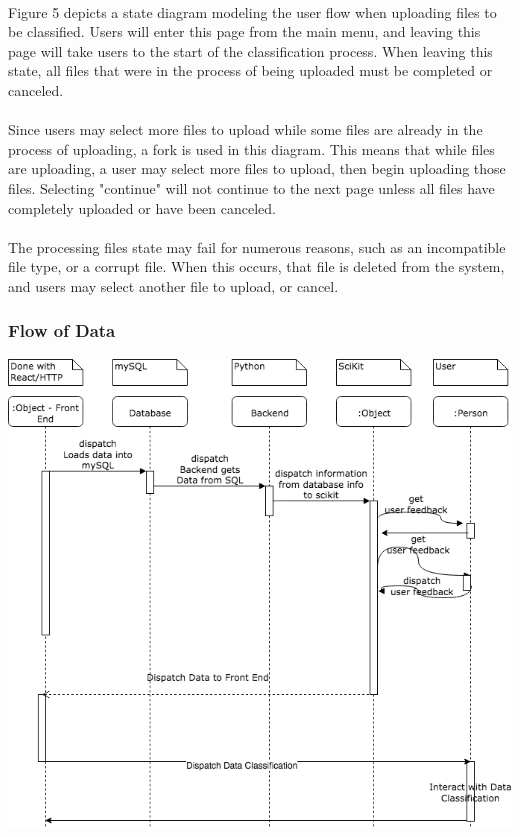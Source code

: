 \documentclass[12pt,oneside,letterpaper]{article}
\begin{document}
\paragraph{} Figure 5 depicts a state diagram modeling the user flow when uploading files to be classified. Users will enter this page from the main menu, and leaving this page will take users to the start of the classification process. When leaving this state, all files that were in the process of being uploaded must be completed or canceled.
\paragraph{} Since users may select more files to upload while some files are already in the process of uploading, a fork is used in this diagram. This means that while files are uploading, a user may select more files to upload, then begin uploading those files. Selecting "continue" will not continue to the next page unless all files have completely uploaded or have been canceled.
\paragraph{} The processing files state may fail for numerous reasons, such as an incompatible file type, or a corrupt file. When this occurs, that file is deleted from the system, and users may select another file to upload, or cancel.

\subsubsection{Flow of Data}
\includegraphics[scale = 0.52]{YarmSequenceDiagram.png}
\begingroup
{}
\endgroup
\end{document}
